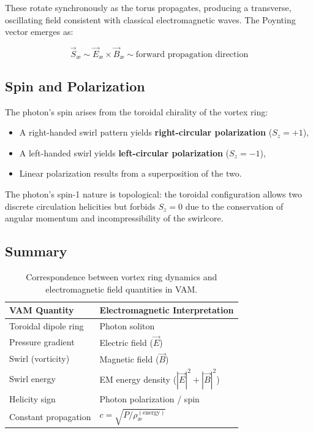 \noindent
These rotate synchronously as the torus propagates, producing a transverse, oscillating field consistent with classical electromagnetic waves. The Poynting vector emerges as:

\begin{equation}
    \vec{S}_\text{æ} \sim \vec{E}_\text{æ} \times \vec{B}_\text{æ} \sim \text{forward propagation direction}
\end{equation}

\subsection{Spin and Polarization}

The photon’s spin arises from the toroidal chirality of the vortex ring:

\begin{itemize}
    \item A right-handed swirl pattern yields \textbf{right-circular polarization} ($S_z = +1$),
    \item A left-handed swirl yields \textbf{left-circular polarization} ($S_z = -1$),
    \item Linear polarization results from a superposition of the two.
\end{itemize}

The photon's spin-1 nature is topological: the toroidal configuration allows two discrete circulation helicities but forbids $S_z = 0$ due to the conservation of angular momentum and incompressibility of the swirlcore.

\subsection{Summary}

\begin{table}[H]
\centering
\renewcommand{\arraystretch}{1.3}
\begin{tabular}{ll}
\toprule
\textbf{VAM Quantity} & \textbf{Electromagnetic Interpretation} \\
\midrule
Toroidal dipole ring     & Photon soliton \\
Pressure gradient        & Electric field ($\vec{E}$) \\
Swirl (vorticity)        & Magnetic field ($\vec{B}$) \\
Swirl energy             & EM energy density ($|\vec{E}|^2 + |\vec{B}|^2$) \\
Helicity sign            & Photon polarization / spin \\
Constant propagation     & $c = \sqrt{P/\rho_\text{\ae}^{(\text{energy})}}$ \\
\bottomrule
\end{tabular}
\caption{Correspondence between vortex ring dynamics and electromagnetic field quantities in VAM.}
\end{table}

